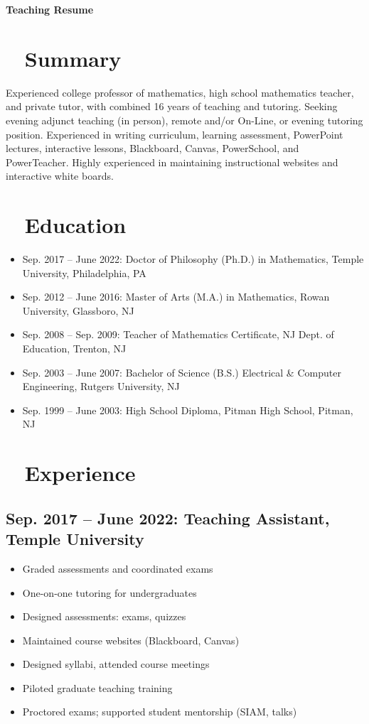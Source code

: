 \documentclass[11pt]{article}
\begin{document}
\begin{center}
    {\huge\bfseries Teaching Resume} \\[0.5ex]
\end{center}

\section*{\faUser ~ Summary}
Experienced college professor of mathematics, high school mathematics teacher, and private tutor, with combined 16 years of teaching and tutoring. Seeking evening adjunct teaching (in person), remote and/or On-Line, or evening tutoring position. Experienced in writing curriculum, learning assessment, PowerPoint lectures, interactive lessons, Blackboard, Canvas, PowerSchool, and PowerTeacher. Highly experienced in maintaining instructional websites and interactive white boards.

\section*{\faGraduationCap ~ Education}
\begin{itemize}
    \item Sep. 2017 -- June 2022: Doctor of Philosophy (Ph.D.) in Mathematics, Temple University, Philadelphia, PA
    \item Sep. 2012 -- June 2016: Master of Arts (M.A.) in Mathematics, Rowan University, Glassboro, NJ
    \item Sep. 2008 -- Sep. 2009: Teacher of Mathematics Certificate, NJ Dept. of Education, Trenton, NJ
    \item Sep. 2003 -- June 2007: Bachelor of Science (B.S.) Electrical \& Computer Engineering, Rutgers University, NJ
    \item Sep. 1999 -- June 2003: High School Diploma, Pitman High School, Pitman, NJ
\end{itemize}

\section*{\faChalkboardTeacher ~ Experience}
\subsection*{Sep. 2017 -- June 2022: Teaching Assistant, Temple University}
\begin{itemize}
    \item Graded assessments and coordinated exams
    \item One-on-one tutoring for undergraduates
    \item Designed assessments: exams, quizzes
    \item Maintained course websites (Blackboard, Canvas)
    \item Designed syllabi, attended course meetings
    \item Piloted graduate teaching training
    \item Proctored exams; supported student mentorship (SIAM, talks)
\end{itemize}
\end{document}
